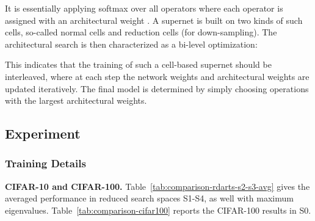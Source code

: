 \documentclass{article} \usepackage{iclr2021_conference,times}
\begin{document}
It is essentially applying softmax over all operators where each operator is assigned with an architectural weight . A supernet is built on two kinds of such cells, so-called normal cells and reduction cells (for down-sampling). The architectural search is then characterized as a bi-level optimization:

This indicates that the training of such a cell-based supernet should be interleaved, where at each step the network weights and architectural weights are updated iteratively. The final model is determined by simply choosing operations with the largest architectural weights.



\subsection{Experiment}

\subsubsection{Training Details}\label{app:train}

\textbf{CIFAR-10 and CIFAR-100.} Table~\ref{tab:comparison-rdarts-s2-s3-avg} gives the averaged performance in reduced search spaces S1-S4, as well with maximum eigenvalues. Table~\ref{tab:comparison-cifar100} reports the CIFAR-100 results in S0. 
\end{document}
